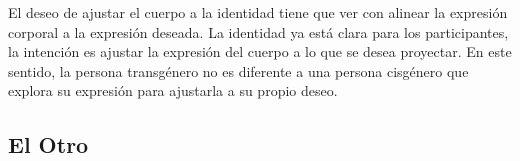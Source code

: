 El deseo de ajustar el cuerpo a la identidad tiene que ver con alinear la
expresión corporal a la expresión deseada. La identidad ya está clara para los
participantes, la intención es ajustar la expresión del cuerpo a lo que se desea
proyectar. En este sentido, la persona transgénero no es diferente a una persona
cisgénero que explora su expresión para ajustarla a su propio deseo.

\subsection{El Otro}
%
%
